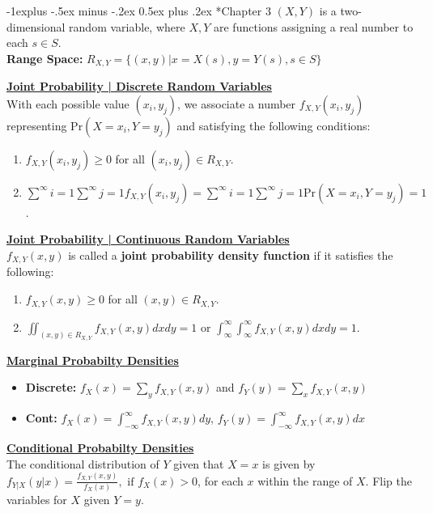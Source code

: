 \documentclass[10pt,landscape]{article}
\makeatletter
\renewcommand{\subsection}{\@startsection{subsection}{2}{0mm}%
                                {-1explus -.5ex minus -.2ex}%
                                {0.5ex plus .2ex}%
                                {\normalfont\normalsize\bfseries}}
\makeatother
\begin{document}
\begin{multicols*}{3}
\subsection*{Chapter 3}
$(X,Y)$ is a two-dimensional random variable, where $X,Y$ are functions assigning a real number to each $s\in S$.\\ 
\textbf{Range Space:} $R_{X,Y}=\{(x,y)|x=X(s),y=Y(s),s∈S\}$

\textbf{\underline{Joint Probability | Discrete Random Variables}} \\
With each possible value $(x_i,y_j)$, we associate a number $f_{X,Y}(x_i,y_j)$ representing $\text{Pr}(X=x_i,Y=y_j)$ and satisfying the following conditions:
\begin{enumerate}[topsep=0pt,noitemsep,wide=0pt, leftmargin=\dimexpr\labelwidth + 2\labelsep\relax]
    \item $f_{X,Y}(x_i,y_j)≥0$ for all $(x_i,y_j)\in R_{X,Y}$. \\ 
    \item $\sum^\infty{i=1}\sum^\infty{j=1}f_{X,Y}(x_i,y_j)=\sum^\infty{i=1}\sum^\infty{j=1}\text{Pr}(X=x_i,Y=y_j)=1$.
\end{enumerate}

\textbf{\underline{Joint Probability | Continuous Random Variables}} \\ 
$f_{X,Y}(x,y)$ is called a \textbf{joint probability density function} if it satisfies the following:
\begin{enumerate}[topsep=0pt,noitemsep,wide=0pt, leftmargin=\dimexpr\labelwidth + 2\labelsep\relax]
    \item $f_{X,Y}(x,y)≥0$ for all $(x,y)\in R_{X,Y}$.
    \item $\iint_{(x,y)\in R_{X,Y}}f_{X,Y}(x,y)dxdy=1$ or $\int_\infty^\infty\int_\infty^\infty f_{X,Y}(x,y)dxdy=1$.
\end{enumerate}

\textbf{\underline{Marginal Probabilty Densities}} \\
\begin{itemize}[topsep=0pt,noitemsep,wide=0pt, leftmargin=\dimexpr{} + 2\relax]
    \item \textbf{Discrete:} $f_X(x)=\sum_y f_{X,Y}(x,y)$ and $f_Y(y)=\sum_xf_{X,Y}(x,y)$
    \item \textbf{Cont:} $f_X(x)=\int_{-\infty}^\infty f_{X,Y}(x,y)dy$, $f_Y(y)=\int_{-\infty}^\infty f_{X,Y}(x,y)dx$
\end{itemize}

\textbf{\underline{Conditional Probabilty Densities}} \\
The conditional distribution of $Y$ given that $X=x$ is given by $f_{Y|X}(y|x)=\frac{f_{X,Y}(x,y)}{f_X(x)}, \text{ if }f_X(x)>0$, for each $x$ within the range of $X$. Flip the variables for $X$ given $Y=y$.


\end{multicols*}
\end{document}
